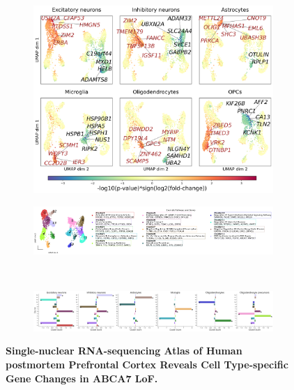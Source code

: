 \begin{figure}[H]
\begin{subfigure}[t]{.5\textwidth}
\begin{subfigure}[t]{.5\textwidth}
        \end{subfigure}
    \\[-3ex] 
    \end{subfigure}
    \begin{subfigure}[t]{0.5\textwidth}
        \caption{}
        \includegraphics[width=\textwidth]{./main_plots/umap_projection_top_genes.png}        
    \end{subfigure}
    \begin{subfigure}[t]{\textwidth}
        \caption{}
        \includegraphics[width=\textwidth]{./main_plots/clusters_umap.png}        
    \end{subfigure}
    \\[-2ex] 
    \begin{subfigure}[t]{\textwidth}
        \caption{}
        \includegraphics[width=\textwidth]{./main_plots/clusters_bars.png}        
    \end{subfigure}
    \caption{
        \textbf{Single-nuclear RNA-sequencing Atlas of Human postmortem Prefrontal Cortex Reveals Cell Type-specific Gene Changes in ABCA7 LoF.}\\
        }
    \label{fig:main_atlas}
\end{figure}
